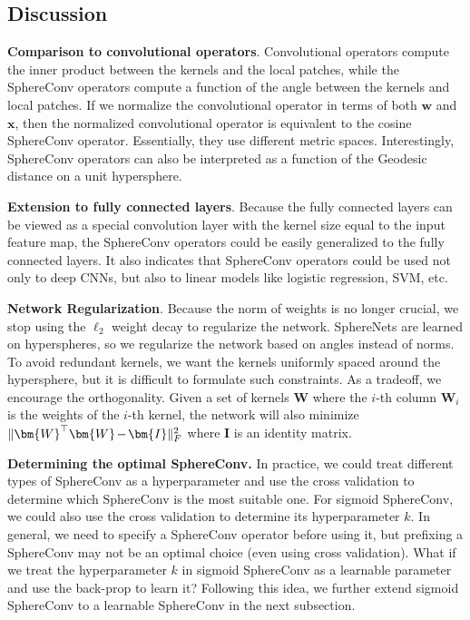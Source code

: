\subsection{Discussion}

\textbf{Comparison to convolutional operators}. Convolutional operators compute the inner product between the kernels and the local patches, while the SphereConv operators compute a function of the angle between the kernels and local patches. If we normalize the convolutional operator in terms of both $\bm{w}$ and $\bm{x}$, then the normalized convolutional operator is equivalent to the cosine SphereConv operator. Essentially, they use different metric spaces. Interestingly, SphereConv operators can also be interpreted as a function of the Geodesic distance on a unit hypersphere.

\par
\textbf{Extension to fully connected layers}. Because the fully connected layers can be viewed as a special convolution layer with the kernel size equal to the input feature map, the SphereConv operators could be easily generalized to the fully connected layers. It also indicates that SphereConv operators could be used not only to deep CNNs, but also to linear models like logistic regression, SVM, etc.
\par
\textbf{Network Regularization}. Because the norm of weights is no longer crucial, we stop using the $\ell_2$ weight decay to regularize the network. SphereNets are learned on hyperspheres, so we regularize the network based on angles instead of norms. To avoid redundant kernels, we want the kernels uniformly spaced around the hypersphere, but it is difficult to formulate such constraints. As a tradeoff, we encourage the orthogonality. Given a set of kernels $\bm{W}$ where the $i$-th column $\bm{W}_i$ is the weights of the $i$-th kernel, the network will also minimize $\thickmuskip=2mu \medmuskip=2mu \|\bm{W}^\top\bm{W}-\bm{I}\|_F^2$ where $\bm{I}$ is an identity matrix.
\par

\textbf{Determining the optimal SphereConv.} In practice, we could treat different types of SphereConv as a hyperparameter and use the cross validation to determine which SphereConv is the most suitable one. For sigmoid SphereConv, we could also use the cross validation to determine its hyperparameter $k$. In general, we need to specify a SphereConv operator before using it, but prefixing a SphereConv may not be an optimal choice (even using cross validation). What if we treat the hyperparameter $k$ in sigmoid SphereConv as a learnable parameter and use the back-prop to learn it? Following this idea, we further extend sigmoid SphereConv to a learnable SphereConv in the next subsection.
\par

